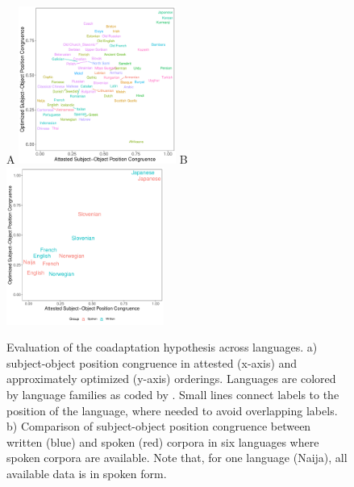 \documentclass[11pt,a4paper]{article}
\begin{document}
\begin{figure}
    \centering
    A
    \includegraphics[width=0.46\textwidth]{../analysis/figures/fracion-optimized_DLM_2.6_format.pdf}
    B
    \includegraphics[width=0.46\textwidth]{../analysis/analysis_spoken/spoken.pdf}
    \caption{Evaluation of the coadaptation hypothesis across languages. a) subject-object position congruence in attested (x-axis) and approximately optimized (y-axis) orderings. Languages are colored by language families as coded by \citet{zeman2020universal}. Small lines connect labels to the position of the language, where needed to avoid overlapping labels. b) Comparison of subject-object position congruence between written (blue) and spoken (red) corpora in six languages where spoken corpora are available. Note that, for one language (Naija), all available data is in spoken form.}
    \label{fig:study1}\label{fig:spoken}
\end{figure}
\end{document}
